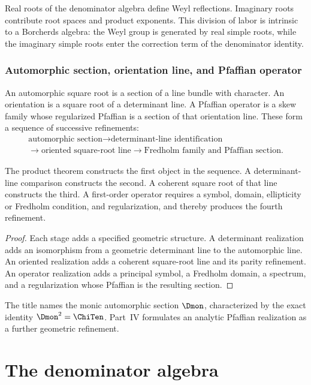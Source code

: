 Real roots of the denominator algebra define Weyl reflections. Imaginary roots contribute root spaces and product exponents. This division of labor is intrinsic to a Borcherds algebra: the Weyl group is generated by real simple roots, while the imaginary simple roots enter the correction term of the denominator identity.

\section{Automorphic section, orientation line, and Pfaffian operator}
An automorphic square root is a section of a line bundle with character. An orientation is a square root of a determinant line. A Pfaffian operator is a skew family whose regularized Pfaffian is a section of that orientation line. These form a sequence of successive refinements:
\[
\begin{gathered}
 \text{automorphic section}
 \longrightarrow \text{determinant-line identification}\\
 \longrightarrow \text{oriented square-root line}
 \longrightarrow \text{Fredholm family and Pfaffian section}.
\end{gathered}
\]

\begin{proposition}
The product theorem constructs the first object in the sequence. A determinant-line comparison constructs the second. A coherent square root of that line constructs the third. A first-order operator requires a symbol, domain, ellipticity or Fredholm condition, and regularization, and thereby produces the fourth refinement.
\end{proposition}
\begin{proof}
Each stage adds a specified geometric structure. A determinant realization adds an isomorphism from a geometric determinant line to the automorphic line. An oriented realization adds a coherent square-root line and its parity refinement. An operator realization adds a principal symbol, a Fredholm domain, a spectrum, and a regularization whose Pfaffian is the resulting section.
\end{proof}

The title names the monic automorphic section $\Dmon$, characterized by the exact identity $\Dmon^2=\ChiTen$. Part~IV formulates an analytic Pfaffian realization as a further geometric refinement.

\part{The denominator algebra}

